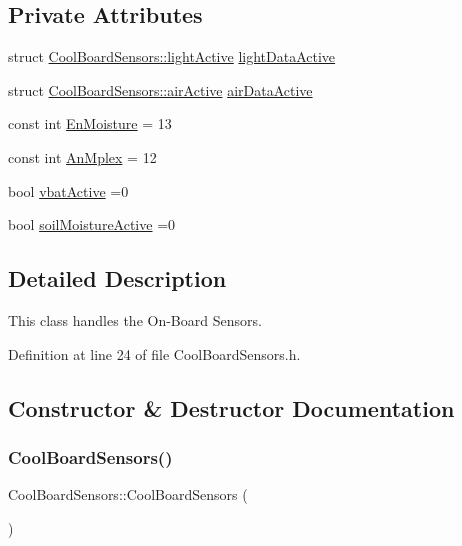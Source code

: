 \subsection*{Private Attributes}
\begin{DoxyCompactItemize}
\item 
struct \hyperlink{struct_cool_board_sensors_1_1light_active}{Cool\+Board\+Sensors\+::light\+Active} \hyperlink{class_cool_board_sensors_ac4deb1cf41bac8b91c780c92fab00ba4}{light\+Data\+Active}
\item 
struct \hyperlink{struct_cool_board_sensors_1_1air_active}{Cool\+Board\+Sensors\+::air\+Active} \hyperlink{class_cool_board_sensors_abff8dfeccb2f7689847bb64d5f1cd31e}{air\+Data\+Active}
\item 
const int \hyperlink{class_cool_board_sensors_a6177d02e14a057a2f171a2e930b5038d}{En\+Moisture} = 13
\item 
const int \hyperlink{class_cool_board_sensors_a12ef28b1046219e0aee10bf64e28c4a5}{An\+Mplex} = 12
\item 
bool \hyperlink{class_cool_board_sensors_ab0b4bbae83796b52b90f91008d383583}{vbat\+Active} =0
\item 
bool \hyperlink{class_cool_board_sensors_ae7971bf527781ac4994309591b78ab89}{soil\+Moisture\+Active} =0
\end{DoxyCompactItemize}


\subsection{Detailed Description}
This class handles the On-\/\+Board Sensors. 

Definition at line 24 of file Cool\+Board\+Sensors.\+h.



\subsection{Constructor \& Destructor Documentation}
\mbox{\label{class_cool_board_sensors_a91ff2a02f5486f90cf2413a1cf8a9ed4}} 
\subsubsection{\texorpdfstring{Cool\+Board\+Sensors()}{CoolBoardSensors()}}
{\footnotesize\ttfamily Cool\+Board\+Sensors\+::\+Cool\+Board\+Sensors (\begin{DoxyParamCaption}{ }\end{DoxyParamCaption})}

